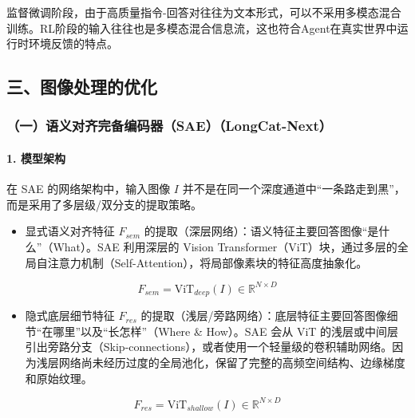 监督微调阶段，由于高质量指令-回答对往往为文本形式，可以不采用多模态混合训练。RL阶段的输入往往也是多模态混合信息流，这也符合Agent在真实世界中运行时环境反馈的特点。

\hypertarget{ux4e09ux56feux50cfux5904ux7406ux7684ux4f18ux5316}{%
\subsection{三、图像处理的优化}\label{ux4e09ux56feux50cfux5904ux7406ux7684ux4f18ux5316}}

\hypertarget{ux4e00ux8bedux4e49ux5bf9ux9f50ux5b8cux5907ux7f16ux7801ux5668saelongcat-next}{%
\subsubsection{（一）语义对齐完备编码器（SAE）（LongCat-Next）}\label{ux4e00ux8bedux4e49ux5bf9ux9f50ux5b8cux5907ux7f16ux7801ux5668saelongcat-next}}

\hypertarget{ux6a21ux578bux67b6ux6784}{%
\paragraph{1. 模型架构}\label{ux6a21ux578bux67b6ux6784}}

在 SAE 的网络架构中，输入图像 \(I\) 并不是在同一个深度通道中``一条路走到黑''，而是采用了多层级/双分支的提取策略。

\begin{itemize}
\tightlist
\item
  显式语义对齐特征 \(F_{sem}\) 的提取（深层网络）：语义特征主要回答图像``是什么''（What）。SAE 利用深层的 Vision Transformer（ViT）块，通过多层的全局自注意力机制（Self-Attention），将局部像素块的特征高度抽象化。
\end{itemize}

\[
F_{sem}=\mathrm{ViT}_{deep}(I)\in \mathbb{R}^{N\times D}
\]

\begin{itemize}
\tightlist
\item
  隐式底层细节特征 \(F_{res}\) 的提取（浅层/旁路网络）：底层特征主要回答图像细节``在哪里''以及``长怎样''（Where \& How）。SAE 会从 ViT 的浅层或中间层引出旁路分支（Skip-connections），或者使用一个轻量级的卷积辅助网络。因为浅层网络尚未经历过度的全局池化，保留了完整的高频空间结构、边缘梯度和原始纹理。
\end{itemize}

\[
F_{res}=\mathrm{ViT}_{shallow}(I)\in \mathbb{R}^{N\times D}
\]


